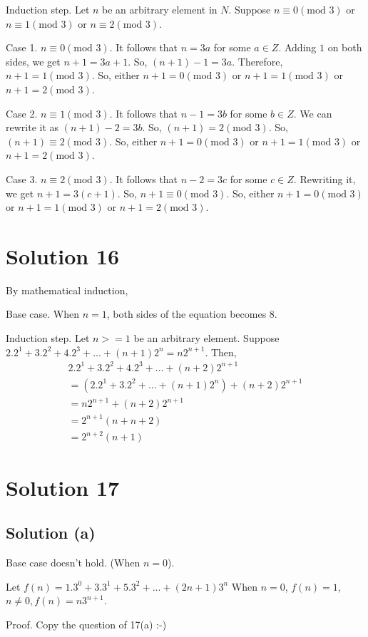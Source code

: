 \documentclass{article}
\begin{document}
Induction step. Let $n$ be an arbitrary element in $N$. Suppose
$n \equiv 0 (\text{mod } 3)$ or $n \equiv 1 (\text{mod } 3)$ or
$n \equiv 2 (\text{mod } 3)$.

Case 1. $n \equiv 0 (\text{mod } 3)$. It follows that $n = 3a$ for
some $a \in Z$. Adding $1$ on both sides, we get $n+1 = 3a + 1$. So,
$(n+1) - 1 = 3a$. Therefore, $n+1 = 1(\text{mod } 3)$. So, either
$n+1 = 0(\text{mod } 3)$ or $n+1 = 1(\text{mod } 3)$ or
$n+1 = 2(\text{mod } 3)$.

Case 2. $n \equiv 1 (\text{mod } 3)$. It follows that $n-1=3b$ for
some $b \in Z$. We can rewrite it as $(n+1) - 2 = 3b$. So,
$(n+1) = 2(\text{mod } 3)$. So, $(n+1) \equiv 2(\text{mod } 3)$. So,
either $n+1 = 0(\text{mod } 3)$ or $n+1 = 1(\text{mod } 3)$ or
$n+1 = 2(\text{mod } 3)$.

Case 3. $n \equiv 2 (\text{mod } 3)$. It follows that $n-2 = 3c$ for
some $c \in Z$. Rewriting it, we get $n+1 = 3(c+1)$. So,
$n+1 \equiv 0 (\text{mod } 3)$. So, either $n+1 = 0(\text{mod } 3)$ or
$n+1 = 1(\text{mod } 3)$ or $n+1 = 2(\text{mod } 3)$.

\section{Solution 16}
By mathematical induction,

Base case. When $n = 1$, both sides of the equation becomes $8$.

Induction step. Let $n >=1$ be an arbitrary element. Suppose $2.2^1 +
3.2^2 + 4.2^3 + ... + (n+1)2^n = n2^{n+1}$. Then,
\begin{align*}
  2.2^1 + 3.2^2 + 4.2^3 + ... + (n+2)2^{n+1} \\
  = (2.2^1 + 3.2^2 + ... + (n+1)2^n) + (n+2)2^{n+1} \\
  = n2^{n + 1} + (n+2)2^{n+1} \\
  = 2^{n+1}(n + n + 2) \\
  = 2^{n+2}(n+1)
\end{align*}

\section{Solution 17}
\subsection{Solution (a)}
Base case doesn't hold. (When $n = 0$).

Let $f(n) = 1.3^0 + 3.3^1 + 5.3^2 + ... + (2n+1)3^n$
When $n = 0$, $f(n) = 1$,
$n \neq 0, f(n) = n3^{n + 1}$.

Proof. Copy the question of 17(a) :-)
\end{document}
